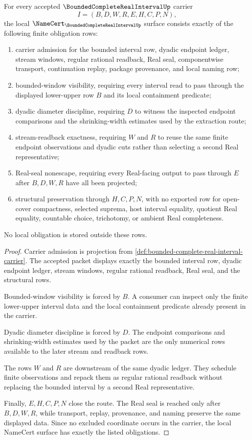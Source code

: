 \begin{theorem}
\label{thm:bounded-complete-real-interval-obligations}
For every accepted $\BoundedCompleteRealIntervalUp$ carrier
$$
I=(B,D,W,R,E,H,C,P,N),
$$
the local $\NameCert_{\BoundedCompleteRealIntervalUp}$ surface consists exactly of the following finite obligation rows:
\begin{enumerate}
\item carrier admission for the bounded interval row, dyadic endpoint ledger, stream windows, regular rational readback, Real seal, componentwise transport, continuation replay, package provenance, and local naming row;
\item bounded-window visibility, requiring every interval read to pass through the displayed lower-upper row $B$ and its local containment predicate;
\item dyadic diameter discipline, requiring $D$ to witness the inspected endpoint comparisons and the shrinking-width estimates used by the extraction route;
\item stream-readback exactness, requiring $W$ and $R$ to reuse the same finite endpoint observations and dyadic cuts rather than selecting a second Real representative;
\item Real-seal nonescape, requiring every Real-facing output to pass through $E$ after $B,D,W,R$ have all been projected;
\item structural preservation through $H,C,P,N$, with no exported row for open-cover compactness, selected suprema, host interval equality, quotient Real equality, countable choice, trichotomy, or ambient Real completeness.
\end{enumerate}
No local obligation is stored outside these rows.
\end{theorem}
\begin{proof}
Carrier admission is projection from \autoref{def:bounded-complete-real-interval-carrier}. The accepted packet displays exactly the bounded interval row, dyadic endpoint ledger, stream windows, regular rational readback, Real seal, and the structural rows.

Bounded-window visibility is forced by $B$. A consumer can inspect only the finite lower-upper interval data and the local containment predicate already present in the carrier.

Dyadic diameter discipline is forced by $D$. The endpoint comparisons and shrinking-width estimates used by the packet are the only numerical rows available to the later stream and readback rows.

The rows $W$ and $R$ are downstream of the same dyadic ledger. They schedule finite observations and repack them as regular rational readback without replacing the bounded interval by a second Real representative.

Finally, $E,H,C,P,N$ close the route. The Real seal is reached only after $B,D,W,R$, while transport, replay, provenance, and naming preserve the same displayed data. Since no excluded coordinate occurs in the carrier, the local NameCert surface has exactly the listed obligations.
\end{proof}

